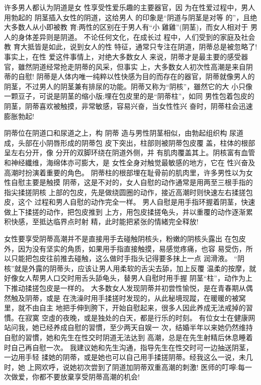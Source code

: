 \documentclass[12pt,UTF8]{ctexbook}
\begin{document}
许多男人都认为阴道是女
性享受性爱乐趣的主要器官，因
为在性爱过程中，男人用勃起的
阴茎插入女性的阴道，这给男人
的印象是“阴道与阴茎是对等
的”，且绝大多数人从小即被教
育:两性的区别在于男人有“小
雞雞”(阴茎)，而女人相对于
男人的身体差异则是阴道。
不论任何文化，在成长过
程中，人们受到的家庭及社会教
育大抵皆是如此，说到女人的性
特征，通常只专注在阴道，阴蒂总是被忽略了!事实上，在性
爱这件事情上，对绝大多数女人
来说，阴蒂才是最主要的感受器官，雖然阴道经常抢走阴蒂的风采，但事实
上，大多数女人初次性高潮是来自阴蒂的自慰!
阴蒂是人体内唯一纯粹以性快感为目的而存在的器官，阴蒂就像男人的
阴茎，不过男人的阴茎兼有排尿的功能。阴蒂又称为“阴核”，雖然它的大
小只像一颗豆子，可说是阴茎的缩小版;埋在包皮里的是“阴蒂柱”，如同
男性包着包皮的阴茎，阴蒂喜欢被触摸，非常敏感，容易兴奋，当女性性兴
奋时，阴蒂柱会迅速膨胀勃起!

阴蒂位在阴道口和尿道之上，构
阴蒂
造与男性阴茎相似，由勃起组织构
尿道
成，头部在小阴唇形成的阴蒂包
皮下突出，柱部则被阴蒂包皮覆
盖，柱体的根部呈左右分开，像
分开的双脚环绕在阴道外侧，并
有肌肉覆盖其上。阴核富有血管
和神经纖维，海绵体亦可膨大，是
女性全身对触觉最敏感的地方，它在
性兴奋及高潮时扮演着重要的角色。
阴蒂柱的根部埋在耻骨前的肌肉里，许多男性以为女性自慰主要是触摸
阴蒂，这是不对的，女人自慰的动作通常是用两至三根手指的指尖揉搓阴核
上部的包皮，先是做绕圆圈的动作，接近高潮时则快速左右揉搓包皮，这个
过程和男人自慰的动作完全一样。
男人自慰是用手指环握着阴茎，快速做上下揉搓的动作，把包皮推到
上方，用包皮揉搓龟头，并以重覆的动作逐渐累积快感，至抵达临界点时射
精，此时能把紧张的情緒完全释放!

女性要享受阴蒂高潮并不是直接用手去碰触阴核头，粉嫩的阴核头露出
在包皮外，因为没有坚实的角质，如果用手指直接触摸，易感觉疼痛，也容
易受伤，所以只能把包皮往前推去碰触，这么做时手指头记得要多抹上一点
润滑液。
“阴核”就是外露的阴蒂头，应该让男人用柔软的舌尖去舔，加上反覆
温柔的按摩，就好像女人帮男人口交时用舌头舔龟头，替男人自慰时用手握
阴茎“柱”，动作为上下推动揉搓包皮是一样的。
大多数女人发现阴蒂并初尝性愉悦，是在青春期从偶然触及阴蒂，或是
在洗澡时用手揉搓时发现的，从此秘境现蹤，在暖暖的被窝里，就不由自主
地把手伸到胯下，开始自慰起来，很多人因此养成无法戒掉的習慣。在寂寞
空虛的夜晚，或是独处的白天，都是行乐的时刻。
有位女士在健康网站问我，她已经养成自慰的習慣，至少两天自娱一
次，结婚半年以来她仍然维持自慰的習慣，她和先生在性交时阴道无法达到
高潮，总是在先生射精后休息睡着时自己再自慰一次。
我建议她和先生沟通，指导先生在性交时可一边抽送阴茎，一边用手轻
揉她的阴蒂，或是她也可以自己用手揉搓阴蒂。经我这么一说，未几时，她
上网欢呼，说她初次尝到了阴道加阴蒂双重高潮的刺激!
医师的叮嚀:每一次做爱，你都不要放棄享受阴蒂高潮的机会!
\end{document}
